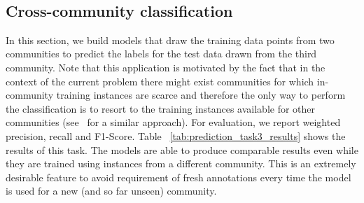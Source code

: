 \documentclass[11pt,a4paper]{article}
\begin{document}
{\begin{table}[!htbp]
	
	\caption{Classification scores for the task of multi-label classification of the types of counterspeech.}
	~\label{tab:prediction_task2_results}
\vspace{-8mm}
\end{table}



\subsection{Cross-community classification}
In this section, we build models that draw the training data points from two communities to predict the labels for the test data drawn from the third community. Note that this application is motivated by the fact that in the context of the current problem there might exist communities for which in-community training instances are scarce and therefore the only way to perform the classification is to resort to the training instances available for other communities (see~\cite{Rudra:2015} for a similar approach). For evaluation, we report weighted precision, recall and F1-Score. Table ~\ref{tab:prediction_task3_results} shows the results of this task. The models are able to produce comparable results even while they are trained using instances from a different community. This is an extremely desirable feature to avoid requirement of fresh annotations every time the model is used for a new  (and so far unseen) community.



\begin{table}[!htbp]
	
\end{table}}
\end{document}
